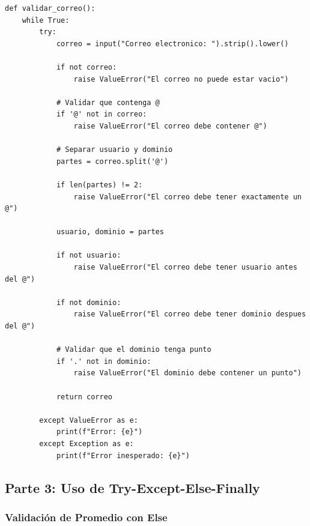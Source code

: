 \documentclass[12pt,a4paper]{article}
\begin{document}
\begin{lstlisting}[caption=Validación basica de correo electronico]
def validar_correo():
    while True:
        try:
            correo = input("Correo electronico: ").strip().lower()
            
            if not correo:
                raise ValueError("El correo no puede estar vacio")
            
            # Validar que contenga @
            if '@' not in correo:
                raise ValueError("El correo debe contener @")
            
            # Separar usuario y dominio
            partes = correo.split('@')
            
            if len(partes) != 2:
                raise ValueError("El correo debe tener exactamente un @")
            
            usuario, dominio = partes
            
            if not usuario:
                raise ValueError("El correo debe tener usuario antes del @")
            
            if not dominio:
                raise ValueError("El correo debe tener dominio despues del @")
            
            # Validar que el dominio tenga punto
            if '.' not in dominio:
                raise ValueError("El dominio debe contener un punto")
            
            return correo
            
        except ValueError as e:
            print(f"Error: {e}")
        except Exception as e:
            print(f"Error inesperado: {e}")
\end{lstlisting}

\subsection{Parte 3: Uso de Try-Except-Else-Finally}

\subsubsection{Validación de Promedio con Else}
\end{document}
